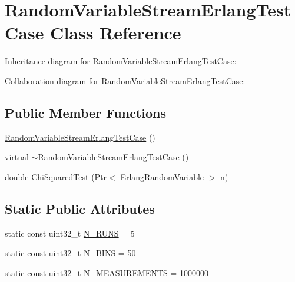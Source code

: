 \hypertarget{classRandomVariableStreamErlangTestCase}{}\section{Random\+Variable\+Stream\+Erlang\+Test\+Case Class Reference}
\label{classRandomVariableStreamErlangTestCase}


Inheritance diagram for Random\+Variable\+Stream\+Erlang\+Test\+Case\+:


Collaboration diagram for Random\+Variable\+Stream\+Erlang\+Test\+Case\+:
\subsection*{Public Member Functions}
\begin{DoxyCompactItemize}
\item 
\hyperlink{classRandomVariableStreamErlangTestCase_a598bae9d695a269a650b1c2b3f4f32fe}{Random\+Variable\+Stream\+Erlang\+Test\+Case} ()
\item 
virtual \hyperlink{classRandomVariableStreamErlangTestCase_ad85883b5b6c010c9a5e238bf3bbf1d1e}{$\sim$\+Random\+Variable\+Stream\+Erlang\+Test\+Case} ()
\item 
double \hyperlink{classRandomVariableStreamErlangTestCase_a5324b5cefae1c456d236e73ca96b2304}{Chi\+Squared\+Test} (\hyperlink{classns3_1_1Ptr}{Ptr}$<$ \hyperlink{classns3_1_1ErlangRandomVariable}{Erlang\+Random\+Variable} $>$ \hyperlink{lte__link__budget__x2__handover__measures_8m_abdb05bc5a064cf642a06c83b3392f148}{n})
\end{DoxyCompactItemize}
\subsection*{Static Public Attributes}
\begin{DoxyCompactItemize}
\item 
static const uint32\+\_\+t \hyperlink{classRandomVariableStreamErlangTestCase_a7d2faa7dc4abace14dd2bf99a2f1d643}{N\+\_\+\+R\+U\+NS} = 5
\item 
static const uint32\+\_\+t \hyperlink{classRandomVariableStreamErlangTestCase_a36dca3fad0131e9871b43ee1273ac354}{N\+\_\+\+B\+I\+NS} = 50
\item 
static const uint32\+\_\+t \hyperlink{classRandomVariableStreamErlangTestCase_a317b0f6b963f81bfb4b5a6962443b0e1}{N\+\_\+\+M\+E\+A\+S\+U\+R\+E\+M\+E\+N\+TS} = 1000000
\end{DoxyCompactItemize}

